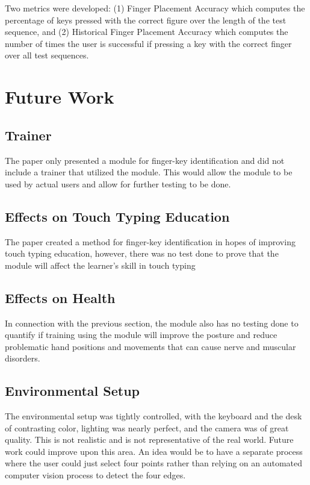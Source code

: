 \documentclass{report}
\begin{document}
Two metrics were developed: (1) Finger Placement Accuracy which computes the
percentage of keys pressed with the correct figure over the length of the test
sequence, and (2) Historical Finger Placement Accuracy which computes the number
of times the user is successful if pressing a key with the correct finger over
all test sequences.

\chapter{Future Work}

\section{Trainer}
The paper only presented a module for finger-key identification and did not
include a trainer that utilized the module. This would allow the module to be
used by actual users and allow for further testing to be done.

\section{Effects on Touch Typing Education}
The paper created a method for finger-key identification in hopes of improving
touch typing education, however, there was no test done to prove that the module
will affect the learner's skill in touch typing

\section{Effects on Health}
In connection with the previous section, the module also has no testing done to
quantify if training using the module will improve the posture and reduce
problematic hand positions and movements that can cause nerve and muscular
disorders.

\section{Environmental Setup}
The environmental setup was tightly controlled, with the keyboard and the desk
of contrasting color, lighting was nearly perfect, and the camera was of great
quality. This is not realistic and is not representative of the real world.
Future work could improve upon this area. An idea would be to have a separate
process where the user could just select four points rather than relying on an
automated computer vision process to detect the four edges.
\end{document}
